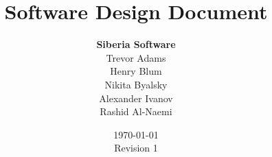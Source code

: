 \documentclass[letterpaper,titlepage]{article}
\begin{document}

\title{\textbf{Software Design Document}}
\author{\textbf{Siberia Software}\\
        Trevor Adams\\
        Henry Blum\\
        Nikita Byalsky\\
        Alexander Ivanov\\
        Rashid Al-Naemi
	}
\date{\today\\Revision 1}
\maketitle
\pagebreak

\thispagestyle{plain}
\setcounter{tocdepth}{3}
\tableofcontents
\pagebreak

\setcounter{page}{1}





\end{document}
